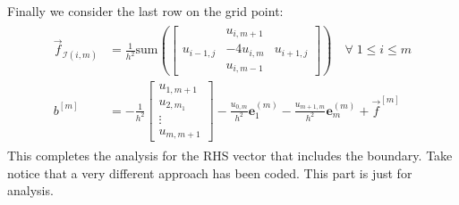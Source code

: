 \documentclass[]{article}
\begin{document}
        Finally we consider the last row on the grid point: 
        \begin{align*}\tag{1.4}\label{eqn:1.4}
            \begin{aligned}
                \vec{f}_{\mathcal{I}(i, m)} &= 
                \frac{1}{h^2}\text{sum}
                \left(
                    \begin{bmatrix}
                        & u_{i, m + 1}&  \\
                        u_{i- 1, j}& -4u_{i, m}&  u_{i + 1, j} \\
                        & u_{i, m - 1}&  
                    \end{bmatrix}
                \right)
                \quad \forall\; 1 \le i \le m
                \\
                b^{[m]} &= 
                -\frac{1}{h^2}\begin{bmatrix}
                    u_{1, m + 1} \\ u_{2, m _ 1} \\ \vdots \\ u_{m, m + 1}
                \end{bmatrix} 
                - \frac{u_{0, m}}{h^2}\mathbf{e}^{(m)}_1 
                - \frac{u_{m + 1, m}}{h^2}\mathbf{e}^{(m)}_m
                + \vec{f}^{[m]}
            \end{aligned}
        \end{align*}
        This completes the analysis for the RHS vector that includes the boundary. Take notice that a very different approach has been coded. This part is just for analysis. 
\end{document}
